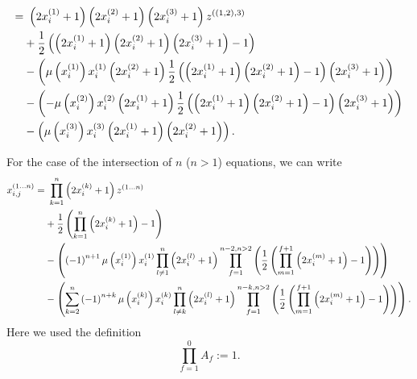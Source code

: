 \begin{alignat}{3}
	=& \ \left(2x_{i}^{\left(1\right)} + 1\right)\left(2x_{i}^{\left(2\right)} + 1\right)\left(2x_{i}^{\left(3\right)} + 1\right)z^{\left(\left(1,2\right),3\right)} \notag \\
	&+ \frac{1}{2}\left(\left(2x_{i}^{\left(1\right)} + 1\right)\left(2x_{i}^{\left(2\right)} + 1\right)\left(2x_{i}^{\left(3\right)} + 1\right) - 1\right) \notag \\
	&- \left(\mu\left(x_{i}^{\left(1\right)}\right) x_{i}^{\left(1\right)}\left(2x_{i}^{\left(2\right)} + 1\right)\frac{1}{2}\left(\left(2x_{i}^{\left(1\right)} + 1\right)\left(2x_{i}^{\left(2\right)} + 1\right) - 1\right)\left(2x_{i}^{\left(3\right)} + 1\right)\right) \notag \\
	&- \left(-\mu\left(x_{i}^{\left(2\right)}\right) x_{i}^{\left(2\right)}\left(2x_{i}^{\left(1\right)} + 1\right)\frac{1}{2}\left(\left(2x_{i}^{\left(1\right)} + 1\right)\left(2x_{i}^{\left(2\right)} + 1\right) - 1\right)\left(2x_{i}^{\left(3\right)} + 1\right)\right) \notag \\
	&- \left(\mu\left(x_{i}^{\left(3\right)}\right)x_{i}^{\left(3\right)}\left(2x_{i}^{\left(1\right)} + 1\right)\left(2x_{i}^{\left(2\right)} + 1\right)\right). \label{eq:step1_sol_xij123}
\end{alignat}

For the case of the intersection of $n$ ($n > 1$) equations, we can write
\begin{alignat}{3}
	x_{i,j}^{\left(1 \dots n\right)} =& \ \prod_{k=1}^{n}\left(2x_{i}^{\left(k\right)} + 1\right)z^{\left(1 \dots n\right)} \notag \\
	&+ \frac{1}{2} \left(\prod_{k=1}^{n} \left(2x_{i}^{\left(k\right)} + 1\right) - 1\right) \notag \\
	&- \left(\left(-1\right)^{n+1}\mu\left(x_{i}^{\left(1\right)}\right)x_{i}^{\left(1\right)} \prod_{l\neq 1}^{n} \left(2x_{i}^{\left(l\right)} + 1\right) \prod_{f=1}^{n-2, n > 2} \left(\frac{1}{2}\left(\prod_{m=1}^{f+1} \left(2x_{i}^{\left(m\right)} + 1\right) - 1\right)\right) \right) \notag \\
	&- \left(\sum_{k=2}^{n} \left(-1\right)^{n+k}\mu\left(x_{i}^{\left(k\right)}\right)x_{i}^{\left(k\right)} \prod_{l\neq k}^{n} \left(2x_{i}^{\left(l\right)} + 1\right) \prod_{f=1}^{n-k, n > 2} \left(\frac{1}{2} \left(\prod_{m=1}^{f+1} \left(2x_{i}^{\left(m\right)} + 1\right) - 1\right)\right)\right). \label{eq:gensol_neqs}
\end{alignat}
Here we used the definition
\begin{equation}
	\prod_{f=1}^{0} A_{f} := 1.
\label{eq:defprod}
\end{equation}

